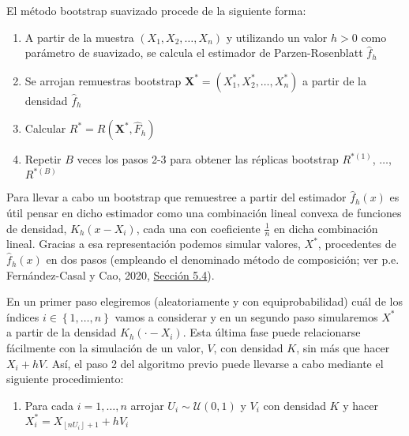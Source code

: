 \documentclass[
]{book}
\providecommand{\tightlist}{%
  \setlength{\itemsep}{0pt}\setlength{\parskip}{0pt}}
\theoremstyle{break}
\theoremstyle{definition}
\theoremstyle{definition}
\theoremstyle{definition}
\theoremstyle{remark}
\begin{document}
El método bootstrap suavizado procede de la siguiente forma:

\begin{enumerate}
\def\labelenumi{\arabic{enumi}.}
\item
  A partir de la muestra \(\left( X_1,X_2,\ldots ,X_n \right)\) y
  utilizando un valor \(h>0\) como parámetro de suavizado, se calcula el
  estimador de Parzen-Rosenblatt \(\hat{f}_{h}\)
\item
  Se arrojan remuestras bootstrap \(\mathbf{X}^{\ast}=\left( X_1^{\ast},X_2^{\ast},\ldots ,X_n^{\ast} \right)\) a partir de
  la densidad \(\hat{f}_{h}\)
\item
  Calcular
  \(R^{\ast}=R\left( \mathbf{X}^{\ast},\hat{F}_{h} \right)\)
\item
  Repetir \(B\) veces los pasos 2-3 para obtener las réplicas bootstrap
  \(R^{\ast (1)}\), \(\ldots\), \(R^{\ast (B)}\)
\end{enumerate}

Para llevar a cabo un bootstrap que remuestree a partir del estimador
\(\hat{f}_{h}\left( x \right)\) es útil pensar en dicho estimador como una
combinación lineal convexa de funciones de densidad, \(K_{h}\left( x-X_i \right)\), cada una con coeficiente \(\frac{1}{n}\) en dicha
combinación lineal. Gracias a esa representación podemos simular
valores,
\(X^{\ast}\), procedentes de \(\hat{f}_{h}\left( x \right)\) en dos pasos (empleando el denominado método de composición; ver p.e. Fernández-Casal y Cao, 2020, \href{https://rubenfcasal.github.io/simbook/m\%C3\%A9todo-de-composici\%C3\%B3n.html}{Sección 5.4}).

En un primer paso elegiremos (aleatoriamente y con equiprobabilidad)
cuál de los índices \(i\in \left\{ 1,\ldots ,n\right\}\) vamos a
considerar y en un segundo paso simularemos \(X^{\ast}\) a partir de la
densidad \(K_{h}\left( \cdot -X_i \right)\). Esta última fase puede relacionarse fácilmente
con la simulación de un valor, \(V\), con densidad \(K\), sin más que hacer
\(X_i+hV\). Así, el paso 2 del algoritmo previo puede llevarse a cabo
mediante el siguiente procedimiento:

\begin{enumerate}
\def\labelenumi{\arabic{enumi}.}
\setcounter{enumi}{1}
\tightlist
\item
  Para cada \(i=1,\ldots ,n\) arrojar \(U_i\sim \mathcal{U}\left( 0,1 \right)\) y
  \(V_i\) con densidad \(K\) y hacer \(X_i^{\ast}=X_{\left\lfloor nU_i\right\rfloor +1}+hV_i\)
\end{enumerate}
\end{document}
